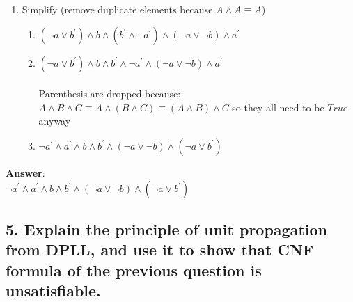 \documentclass[a4paper, 14pt]{report}
\newcommand{\answer}[1]{%
	\begin{flushleft}
		\textbf{Answer}:\\
			#1
	\end{flushleft}}
\newcommand{\question}[1]{\subsection*{#1}}
\begin{document}
\begin{enumerate}
\begin{enumerate}
			\pagebreak

		\item Simplify (remove duplicate elements because $ A \wedge A \equiv A$)
		
			\begin{enumerate}		
				\item $ (\neg a \vee b^\prime) \wedge b \wedge (b^\prime \wedge \neg a^\prime) \wedge (\neg a \vee \neg b) \wedge a^\prime  $ \\ 
				\item $ (\neg a \vee b^\prime) \wedge b \wedge b^\prime \wedge \neg a^\prime \wedge (\neg a \vee \neg b) \wedge a^\prime  $ \\  \\
					Parenthesis are dropped because: $ A \wedge B \wedge C \equiv A \wedge (B \wedge C) \equiv (A \wedge B) \wedge C $
					so they all need to be $True$ anyway \\
				\item $ \neg a^\prime \wedge a^\prime \wedge b \wedge b^\prime \wedge (\neg a \vee \neg b)  \wedge (\neg a \vee b^\prime) $ \\ 
			\end{enumerate}		

	\end{enumerate}		
\end{enumerate}		

\hline

\answer{$ \neg a^\prime \wedge a^\prime \wedge b \wedge b^\prime \wedge (\neg a \vee \neg b)  \wedge (\neg a \vee b^\prime) $ \\}

\question{5. Explain the principle of unit propagation from DPLL, and use
  it to show that CNF formula of the previous question is unsatisfiable.}
\end{document}
